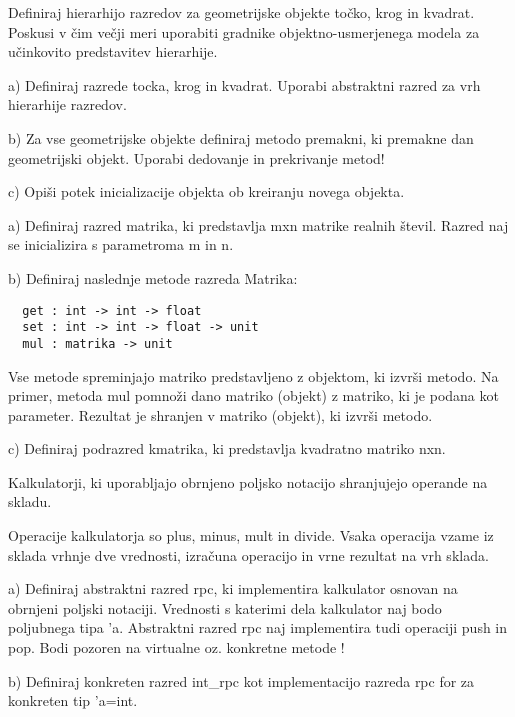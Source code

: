 \begin{ex}
Definiraj hierarhijo razredov za geometrijske objekte to\v cko, krog in kvadrat. Poskusi v \v cim ve\v cji meri uporabiti gradnike objektno-usmerjenega modela za u\v cinkovito predstavitev hierarhije. 

a) Definiraj razrede tocka, krog in kvadrat. Uporabi abstraktni razred za vrh hierarhije razredov.

b) Za vse geometrijske objekte definiraj metodo premakni, ki premakne dan geometrijski objekt. Uporabi dedovanje in prekrivanje metod!

c) Opi\v si potek inicializacije objekta ob kreiranju novega objekta.

\end{ex} 
\begin{ex}
  a) Definiraj razred matrika, ki predstavlja mxn matrike realnih \v
  stevil. Razred naj se inicializira s parametroma m in n.

  b) Definiraj naslednje metode razreda Matrika:
\begin{lstlisting}
  get : int -> int -> float
  set : int -> int -> float -> unit
  mul : matrika -> unit
\end{lstlisting}

  Vse metode spreminjajo matriko predstavljeno z objektom, ki izvr\v
  si metodo.  Na primer, metoda mul pomno\v zi dano matriko (objekt) z
  matriko, ki je podana kot parameter. Rezultat je shranjen v matriko
  (objekt), ki izvr\v si metodo.

  c) Definiraj podrazred kmatrika, ki predstavlja kvadratno matriko
  nxn.


\end{ex} 
\begin{ex}
  Kalkulatorji, ki uporabljajo obrnjeno poljsko notacijo shranjujejo
  operande na skladu.

  Operacije kalkulatorja so plus, minus, mult in divide. Vsaka
  operacija vzame iz sklada vrhnje dve vrednosti, izra\v cuna
  operacijo in vrne rezultat na vrh sklada.

  a) Definiraj abstraktni razred rpc, ki implementira kalkulator
  osnovan na obrnjeni poljski notaciji. Vrednosti s katerimi dela
  kalkulator naj bodo poljubnega tipa 'a. Abstraktni razred rpc naj
  implementira tudi operaciji push in pop. Bodi pozoren na
  virtualne oz. konkretne metode !

  b) Definiraj konkreten razred int\_rpc kot implementacijo razreda
  rpc for za konkreten tip 'a=int.


\end{ex} 

